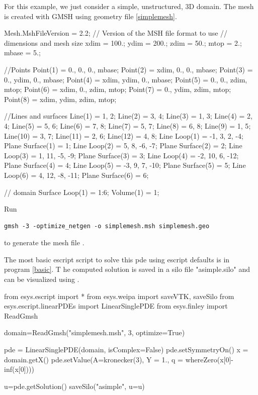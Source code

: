 For this example, we just consider a simple, unstructured, 3D domain.  The mesh is created with GMSH using  geometry file \ref{simplemesh}.
\begin{python}[caption=simplemesh.geo,label=simplemesh]
    Mesh.MshFileVersion = 2.2; // Version of the MSH file format to use
// dimensions and mesh size
xdim = 100.;
ydim = 200.;
zdim = 50.;
mtop = 2.;
mbase = 5.;

//Points
Point(1) = {0., 0., 0., mbase};
Point(2) = {xdim, 0., 0., mbase};
Point(3) = {0., ydim, 0., mbase};
Point(4) = {xdim, ydim, 0., mbase};
Point(5) = {0., 0., zdim, mtop};
Point(6) = {xdim, 0., zdim, mtop};
Point(7) = {0., ydim, zdim, mtop};
Point(8) = {xdim, ydim, zdim, mtop};

//Lines and surfaces
Line(1) = {1, 2};
Line(2) = {3, 4};
Line(3) = {1, 3};
Line(4) = {2, 4};
Line(5) = {5, 6};
Line(6) = {7, 8};
Line(7) = {5, 7};
Line(8) = {6, 8};
Line(9) = {1, 5};
Line(10) = {3, 7};
Line(11) = {2, 6};
Line(12) = {4, 8};
Line Loop(1) = {-1, 3, 2, -4};
Plane Surface(1) = {1};
Line Loop(2) = {5, 8, -6, -7};
Plane Surface(2) = {2};
Line Loop(3) = {1, 11, -5, -9};
Plane Surface(3) = {3};
Line Loop(4) = {-2, 10, 6, -12};
Plane Surface(4) = {4};
Line Loop(5) = {-3, 9, 7, -10};
Plane Surface(5) = {5};
Line Loop(6) = {4, 12, -8, -11};
Plane Surface(6) = {6};

// domain
Surface Loop(1) = {1:6};
Volume(1) = {1};
\end{python}
Run
\begin{verbatim}
gmsh -3 -optimize_netgen -o simplemesh.msh simplemesh.geo
\end{verbatim}
to generate the mesh file .

The most basic escript script to solve this pde using escript defaults is in program \ref{basic}.  T
he computed solution is saved in a silo file "asimple.silo" and can be visualized using \VisIt.
\begin{python}[caption=basic solve using defaults only, label=basic ]
from esys.escript import *
from esys.weipa import saveVTK, saveSilo
from esys.escript.linearPDEs import LinearSinglePDE
from esys.finley import ReadGmsh

domain=ReadGmsh("simplemesh.msh", 3, optimize=True)

pde = LinearSinglePDE(domain, isComplex=False)
pde.setSymmetryOn()
x = domain.getX()
pde.setValue(A=kronecker(3), Y = 1., q = whereZero(x[0]-inf(x[0])))

u=pde.getSolution()    
saveSilo("asimple", u=u)    
\end{python}

